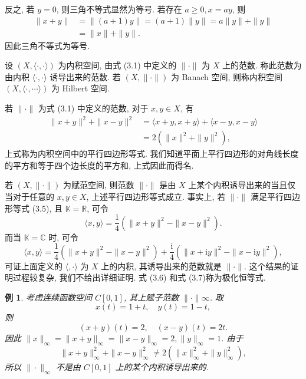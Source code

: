 \documentclass[openany]{ctexbook}
\makeatletter
\theoremstyle{kaiti}
\theoremstyle{normal}
\newtheorem{example}{例}[section]
\renewenvironment{proof}[1][\proofname]{\par
    \pushQED{\qed}%
    \normalfont \topsep6\p@\@plus6\p@\relax
    \trivlist
    \item\relax
    {\heiti #1}\hspace{2\labelsep}\ignorespaces
  }{%
    \popQED\endtrivlist\@endpefalse
  }
\makeatother
\begin{document}
\begin{proof}
反之, 若 $y=0$, 则三角不等式显然为等号. 若存在 $a \geqslant 0, x=a y$, 则
$$
\begin{aligned}
\|x+y\| &=\|(a+1) y\|=(a+1)\|y\|=a\|y\|+\|y\| \\
&=\|x\|+\|y\|.
\end{aligned}
$$
因此三角不等式为等号.
\end{proof}

设 $(X,\langle\cdot, \cdot\rangle)$ 为内积空间, 由式 (3.1) 中定义的 $\|\cdot\|$ 为 $X$ 上的范数. 称此范数为由内积 $\langle\cdot, \cdot\rangle$ 诱导出来的范数. 若 $(X,\|\cdot\|)$ 为 Banach 空间, 则称内积空间 $(X,\langle\cdot, \cdots\rangle)$ 为 Hilbert 空间.

若 $\|\cdot\|$ 为式 (3.1) 中定义的范数, 对于 $x, y \in X$, 有
\begin{equation}
  \begin{aligned}
    \|x+y\|^2+\|x-y\|^2&=\langle x+y, x+y\rangle+\langle x-y, x-y\rangle\\
    &=2\left(\|x\|^2+\|y\|^2\right),
  \end{aligned}
\end{equation}
上式称为内积空间中的平行四边形等式. 我们知道平面上平行四边形的对角线长度的平方和等于四个边长度的平方和, 上式因此而得名.

若 $(X,\|\cdot\|)$ 为赋范空间, 则范数 $\|\cdot\|$ 是由 $X$ 上某个内积诱导出来的当且仅当对于任意的 $x, y \in X$, 上述平行四边形等式成立. 事实上, 若 $\|\cdot\|$ 满足平行四边形等式 (3.5), 且 $\mathbb{K}=\mathbb{R}$, 可令
\begin{equation}
  \langle x, y\rangle=\frac{1}{4}\left(\|x+y\|^2-\|x-y\|^2\right).
\end{equation}
而当 $\mathbb{K}=\mathbb{C}$ 时, 可令
\begin{equation}
  \langle x, y\rangle=\frac{1}{4}\left(\|x+y\|^2-\|x-y\|^2\right)+\frac{\mathrm{i}}{4}\left(\|x+\mathrm{i} y\|^2-\|x-\mathrm{i} y\|^2\right),
\end{equation}
可证上面定义的 $\langle, \cdot\rangle$ 为 $X$ 上的内积, 其诱导出来的范数就是 $\|\cdot\|$. 这个结果的证明过程较复杂, 我们不给出详细证明. 式 (3.6) 和式 (3.7)称为极化恒等式.

\begin{example}
考虑连续函数空间 $C[0,1]$, 其上赋子范数 $\|\cdot\| \infty$. 取
$$
x(t)=1+t, \quad y(t)=1-t,
$$
则
$$
(x+y)(t)=2, \quad(x-y)(t)=2 t.
$$
因此 $\|x\|_{\infty}=\|x+y\|_{\infty}=\|x-y\|_{\infty}=2,\|y\|_{\infty}=1$. 由于
$$
\|x+y\|_\infty^2+\|x-y\|_\infty^2 \neq 2(\|x\|_\infty^2+\|y\|_\infty^2),
$$
所以 $\|\cdot\|_{\infty}$ 不是由 $C[0,1]$ 上的某个内积诱导出来的.
\end{example}
\end{document}
